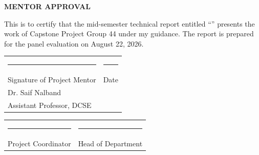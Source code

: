 \begin{center}
\vspace*{1.0cm}
{\Large\textbf{MENTOR APPROVAL}}\\
\vspace{1.0cm}
\end{center}

This is to certify that the mid-semester technical report entitled
``\projecttitle'' presents the work of Capstone Project Group 44 under my
guidance. The report is prepared for the panel evaluation on August 22, 2026.

\vspace{1.5in}
\noindent
\begin{tabularx}{\textwidth}{X X}
\rule{2.2in}{0.4pt} & \rule{2.2in}{0.4pt}\\
Signature of Project Mentor & Date\\[0.15in]
Dr. Saif Nalband & \\
Assistant Professor, DCSE &
\end{tabularx}

\vfill
\noindent
\begin{tabularx}{\textwidth}{X X}
\rule{2.2in}{0.4pt} & \rule{2.2in}{0.4pt}\\
Project Coordinator & Head of Department
\end{tabularx}
\clearpage
